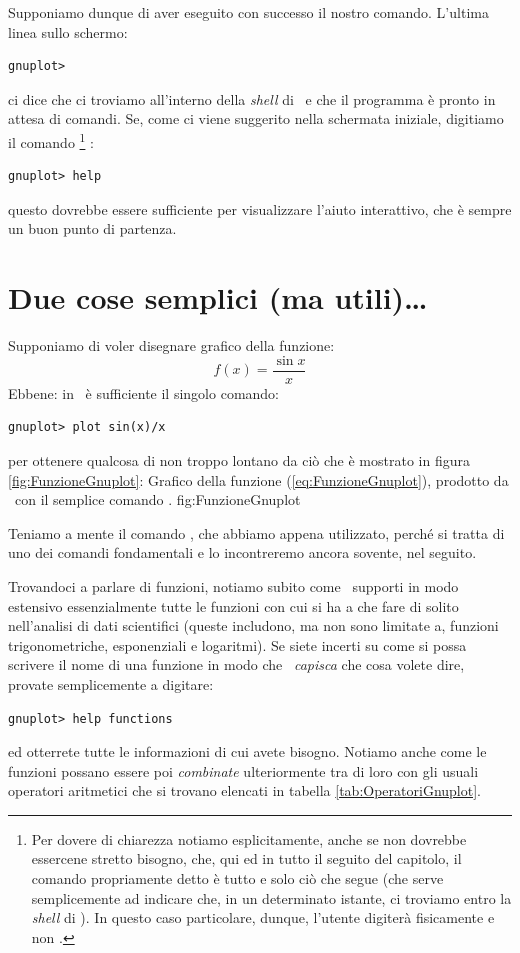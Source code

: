 Supponiamo dunque di aver eseguito con successo il nostro comando.
L'ultima linea
sullo schermo:
\begin{verbatim}
gnuplot>
\end{verbatim}
ci dice che ci troviamo all'interno della \emph{shell} di \gnuplot\ e che il
programma \`e pronto in attesa di comandi.
Se, come ci viene suggerito nella schermata iniziale, digitiamo il comando%
\footnote{
Per dovere di chiarezza notiamo esplicitamente, anche se non dovrebbe
essercene stretto bisogno, che, qui ed in tutto il seguito del capitolo,
il comando propriamente detto \`e tutto e solo ci\`o che segue
 (che serve semplicemente ad indicare che, in un determinato
istante, ci troviamo entro la \emph{shell} di \gnuplot).
In questo caso particolare, dunque, l'utente digiter\`a fisicamente
 e non . 
}%
:
\begin{verbatim}
gnuplot> help
\end{verbatim}
questo dovrebbe essere sufficiente per visualizzare l'aiuto interattivo,
che \`e sempre un buon punto di partenza.


\section{Due cose semplici (ma utili)\ldots}

Supponiamo di voler disegnare grafico della funzione:
\begin{equation}\label{eq:FunzioneGnuplot}
f(x) = \frac{\sin x}{x}
\end{equation}
Ebbene: in \gnuplot\ \`e sufficiente il singolo comando:
\begin{verbatim}
gnuplot> plot sin(x)/x
\end{verbatim}
per ottenere qualcosa di non troppo lontano da ci\`o che \`e mostrato in figura
\ref{fig:FunzioneGnuplot}:
\panelfig
{}
{Grafico della funzione (\ref{eq:FunzioneGnuplot}), prodotto
da \gnuplot\ con il semplice comando .}
{fig:FunzioneGnuplot}

\noindent Teniamo a mente il comando , che abbiamo appena
utilizzato, perch\'e si tratta di uno dei comandi fondamentali e lo
incontreremo ancora sovente, nel seguito.

Trovandoci a parlare di funzioni, notiamo subito come \gnuplot\
supporti in modo estensivo essenzialmente tutte le funzioni con cui si ha a
che fare di solito nell'analisi di dati scientifici (queste includono, ma non
sono limitate a, funzioni trigonometriche, esponenziali e logaritmi).
Se siete incerti su come si possa scrivere il nome di una funzione in modo
che \gnuplot\ \emph{capisca} che cosa volete dire, provate semplicemente a
digitare:
\begin{verbatim}
gnuplot> help functions
\end{verbatim}
ed otterrete tutte le informazioni di cui avete bisogno.
Notiamo anche come le funzioni possano essere poi \emph{combinate}
ulteriormente tra di loro con gli usuali operatori aritmetici che si trovano
elencati in tabella
\ref{tab:OperatoriGnuplot}.

